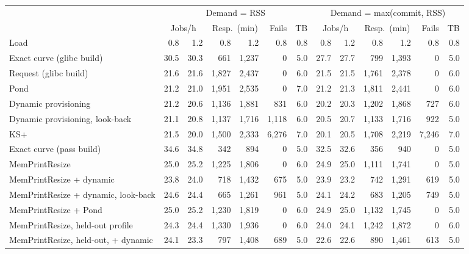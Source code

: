 \begin{tabular}{lrrrrrrrrrrrr}
\toprule
 & \multicolumn{6}{c}{Demand = RSS} & \multicolumn{6}{c}{Demand = max(commit, RSS)} \\
\cmidrule(lr){2-7} \cmidrule(lr){8-13}
 & \multicolumn{2}{c}{Jobs/h} & \multicolumn{2}{c}{Resp.\ (min)} & Fails & TB & \multicolumn{2}{c}{Jobs/h} & \multicolumn{2}{c}{Resp.\ (min)} & Fails & TB \\
Load & 0.8 & 1.2 & 0.8 & 1.2 & 0.8 & 0.8 & 0.8 & 1.2 & 0.8 & 1.2 & 0.8 & 0.8 \\
\midrule
Exact curve (glibc build) & 30.5 & 30.3 & 661 & 1{,}237 & 0 & 5.0 & 27.7 & 27.7 & 799 & 1{,}393 & 0 & 5.0 \\
Request (glibc build) & 21.6 & 21.6 & 1{,}827 & 2{,}437 & 0 & 6.0 & 21.5 & 21.5 & 1{,}761 & 2{,}378 & 0 & 6.0 \\
Pond & 21.2 & 21.0 & 1{,}951 & 2{,}535 & 0 & 7.0 & 21.2 & 21.3 & 1{,}811 & 2{,}441 & 0 & 6.0 \\
Dynamic provisioning & 21.2 & 20.6 & 1{,}136 & 1{,}881 & 831 & 6.0 & 20.2 & 20.3 & 1{,}202 & 1{,}868 & 727 & 6.0 \\
Dynamic provisioning, look-back & 21.1 & 20.8 & 1{,}137 & 1{,}716 & 1{,}118 & 6.0 & 20.5 & 20.7 & 1{,}133 & 1{,}716 & 922 & 5.0 \\
KS+ & 21.5 & 20.0 & 1{,}500 & 2{,}333 & 6{,}276 & 7.0 & 20.1 & 20.5 & 1{,}708 & 2{,}219 & 7{,}246 & 7.0 \\
Exact curve (pass build) & 34.6 & 34.8 & 342 & 894 & 0 & 5.0 & 32.5 & 32.6 & 356 & 940 & 0 & 5.0 \\
MemPrintResize & 25.0 & 25.2 & 1{,}225 & 1{,}806 & 0 & 6.0 & 24.9 & 25.0 & 1{,}111 & 1{,}741 & 0 & 5.0 \\
MemPrintResize + dynamic & 23.8 & 24.0 & 718 & 1{,}432 & 675 & 5.0 & 23.9 & 23.2 & 742 & 1{,}291 & 619 & 5.0 \\
MemPrintResize + dynamic, look-back & 24.6 & 24.4 & 665 & 1{,}261 & 961 & 5.0 & 24.1 & 24.2 & 683 & 1{,}205 & 749 & 5.0 \\
MemPrintResize + Pond & 25.0 & 25.2 & 1{,}230 & 1{,}819 & 0 & 6.0 & 24.9 & 25.0 & 1{,}132 & 1{,}745 & 0 & 5.0 \\
MemPrintResize, held-out profile & 24.3 & 24.4 & 1{,}330 & 1{,}936 & 0 & 6.0 & 24.0 & 24.1 & 1{,}242 & 1{,}872 & 0 & 6.0 \\
MemPrintResize, held-out, + dynamic & 24.1 & 23.3 & 797 & 1{,}408 & 689 & 5.0 & 22.6 & 22.6 & 890 & 1{,}461 & 613 & 5.0 \\
\bottomrule
\end{tabular}
